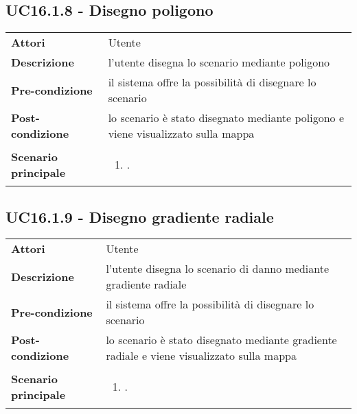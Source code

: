 \subsection{UC16.1.8 - Disegno poligono} 
\label{sssec:UC16.1.8} 
\def\arraystretch{1.5}
\begin{tabularx}{\textwidth}{l|p{}}
	\rowcolor{I} \multicolumn{2}{c}{\color{white}\textbf{UC16.1.8 - Disegno poligono}} \\
	\toprule
	\endhead
	\textbf{Attori} & Utente\\
	\textbf{Descrizione} & l'utente disegna lo scenario mediante poligono\\
	\textbf{Pre-condizione} & il sistema offre la possibilità di disegnare lo scenario\\
	\textbf{Post-condizione} & lo scenario è stato disegnato mediante poligono e viene visualizzato sulla mappa\\
	\textbf{Scenario principale} & \vspace{-1.2em}\begin{enumerate}[leftmargin=*,noitemsep,nosep]
		\item \nameref{sssec:UC16.1.8}.
	\end{enumerate}\\
	\bottomrule
\end{tabularx}
\subsection{UC16.1.9 - Disegno gradiente radiale} 
\label{sssec:UC16.1.9} 
\def\arraystretch{1.5}
\begin{tabularx}{\textwidth}{l|p{}}
	\rowcolor{I} \multicolumn{2}{c}{\color{white}\textbf{UC16.1.9 - Disegno gradiente radiale}} \\
	\toprule
	\endhead
	\textbf{Attori} & Utente\\
	\textbf{Descrizione} & l'utente disegna lo scenario di danno mediante gradiente radiale\\
	\textbf{Pre-condizione} & il sistema offre la possibilità di disegnare lo scenario\\
	\textbf{Post-condizione} & lo scenario è stato disegnato mediante gradiente radiale e viene visualizzato sulla mappa\\
	\textbf{Scenario principale} & \vspace{-1.2em}\begin{enumerate}[leftmargin=*,noitemsep,nosep]
		\item \nameref{sssec:UC16.1.9}.
	\end{enumerate}\\
	\bottomrule
\end{tabularx}
